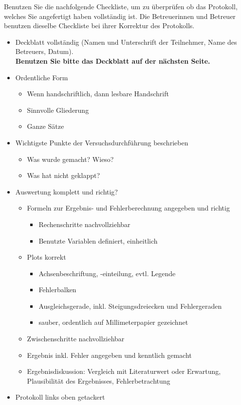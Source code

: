 Benutzen Sie die nachfolgende Checkliste, um zu überprüfen ob das Protokoll, welches Sie angefertigt haben vollständig ist. Die Betreuerinnen und Betreuer benutzen dieselbe Checkliste bei ihrer Korrektur des Protokolls.
\begin{itemize}[label={$\square$}]
	\item Deckblatt vollständig (Namen und Unterschrift der Teilnehmer, Name des Betreuers, Datum). \\
		\textbf{Benutzen Sie bitte das Deckblatt auf der nächsten Seite.}
	\item Ordentliche Form
	\begin{itemize}[label={$\square$}]
		\item Wenn handschriftlich, dann lesbare Handschrift
		\item Sinnvolle Gliederung
		\item Ganze Sätze
	\end{itemize}
	\item Wichtigste Punkte der Versuchsdurchführung beschrieben
	\begin{itemize}[label={$\square$}]
		\item Was wurde gemacht? Wieso?
		\item Was hat nicht geklappt?
	\end{itemize}
	\item Auswertung komplett und richtig?
		\begin{itemize}[label={$\square$}]
			\item Formeln zur Ergebnis- und Fehlerberechnung angegeben und richtig
			\begin{itemize}[label={$\square$}]
				\item Rechenschritte nachvollziehbar
				\item Benutzte Variablen definiert, einheitlich
			\end{itemize}
			\item Plots korrekt
			\begin{itemize}[label={$\square$}]
				\item Achsenbeschriftung, -einteilung, evtl. Legende
				\item Fehlerbalken
				\item Ausgleichsgerade, inkl. Steigungsdreiecken und Fehlergeraden
				\item sauber, ordentlich auf Millimeterpapier gezeichnet
			\end{itemize}
			\item Zwischenschritte nachvollziehbar
			\item Ergebnis inkl. Fehler angegeben und kenntlich gemacht
			\item Ergebnisdiskussion: Vergleich mit Literaturwert oder Erwartung, Plausibilität des Ergebnisses, Fehlerbetrachtung
		\end{itemize}
	\item Protokoll links oben getackert
\end{itemize}

